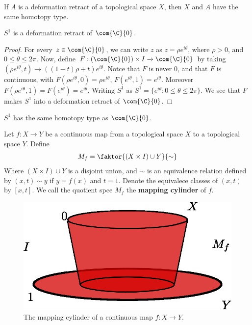 \begin{theorem}\label{2.4.12}
    If $A$ is a deformation retract of a topological space  $X$, then  $X$ and
    $A$ have the same homotopy type.
\end{theorem}
\begin{corollary}
    $S^1$ is a deformation retract of  $\com{\C}{0}$.
\end{corollary}
\begin{proof}
    For every $z \in \com{\C}{0}$, we can write $z$ as  $z=\rho e^{i\theta}$,
    where $\rho>0$, and  $0 \leq \theta \leq 2\pi$. Now, define
    $F:(\com{\C}{0}) \times I \xrightarrow{} \com{\C}{0}$ by taking $(\rho
    e^{i\theta},t) \xrightarrow{} ((1-t)\rho+t)e^{i\theta}$. Notce that $F$ is
    never  $0$, and that $F$ is continuous, with $F(\rho e^{i\theta},0)=\rho
    e^{i\theta}$, $F(e^{i\theta},1)=e^{i\theta}$. Moreover $F(\rho
    e^{i\theta},1)=F(e^{i\theta})=e^{i\theta}$. Writing $S^1$ as
    $S^1=\{e^{i\theta} : 0 \leq \theta \leq 2\pi\}$. We see that $F$ makes $S^1$
    into a deformation retract of $\com{\C}{0}$.
\end{proof}
\begin{corollary}
    $S^1$ has the same homotopy type as  $\com{\C}{0}$.
\end{corollary}

\begin{definition}
    Let $f:X \xrightarrow{} Y$ be a continuous map from a topological space $X$
    to a topological space  $Y$. Define
    \begin{equation*}
        M_f=\faktor{(X \times I) \cup Y}{\sim}
    \end{equation*}
    Where $(X \times I) \cup Y$ is a disjoint union, and $\sim$ is an
    equivalence relation defined by $(x,t) \sim y$ if $y=f(x)$ and  $t=1$.
    Denote the equivalece classes of $(x,t)$ by $[x,t]$. We call the quotient
    spce $M_f$ the  \textbf{mapping cylinder} of $f$.
\end{definition}

\begin{figure}[h]
    \centering
    \includegraphics[scale=0.5]{Figures/chapter2/mapping_cylinder.eps}
    \caption{The mapping cylinder of a continuous map $f:X \xrightarrow{} Y$.}
    \label{fig_2.2}
\end{figure}
